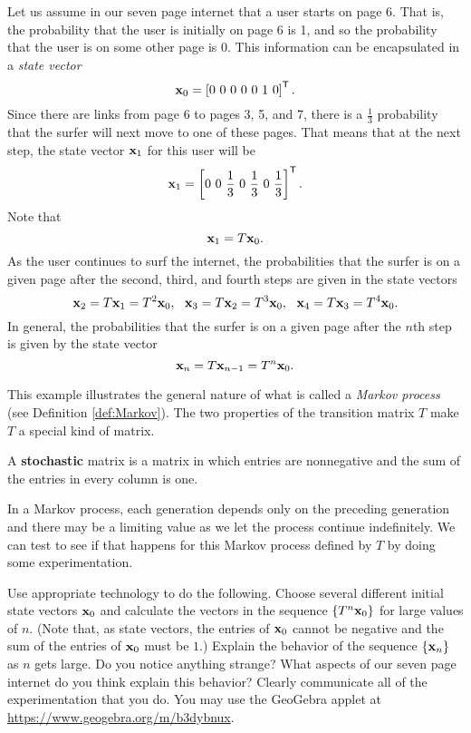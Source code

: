 Let us assume in our seven page internet that a user starts on page 6. That is, the probability that the user is initially on page 6 is 1, and so the probability that the user is on some other page is 0. This information can be encapsulated in a \emph{state vector}
\[\vx_0 = \left[ 0 \ 0 \ 0 \ 0 \ 0 \ 1 \ 0  \right]^{\tr}.\]
Since there are links from page 6 to pages 3, 5, and 7, there is a $\frac{1}{3}$ probability that the surfer will next move to one of these pages. That means that at the next step, the state vector $\mathbf{x}_1$ for this user will be
\[\vx_1 = \left[ 0 \ 0 \ \frac{1}{3} \ 0 \ \frac{1}{3} \ 0 \ \frac{1}{3} \right]^{\tr}.\]
Note that
\[\mathbf{x}_1 = T\mathbf{x}_0.\]
As the user continues to surf the internet, the probabilities that the surfer is on a given page after the second, third, and fourth steps are given in the state vectors
\[\mathbf{x}_2 = T\mathbf{x}_1 = T^2 \mathbf{x}_0, \ \ \mathbf{x}_3 = T\mathbf{x}_2 = T^3 \mathbf{x}_0, \ \ \mathbf{x}_4 = T\mathbf{x}_3 = T^4 \mathbf{x}_0.\]
In general, the probabilities that the surfer is on a given page after the $n$th step is given by the state vector
\[\mathbf{x}_n = T \mathbf{x}_{n-1} = T^n \mathbf{x}_0.\]

This example illustrates the general nature of what is called a \emph{Markov process} (see Definition \ref{def:Markov}).  The two properties of the transition matrix $T$ make $T$ a special kind of matrix.

\begin{definition}  A \textbf{stochastic} matrix is a matrix in which entries are nonnegative and the sum of the entries in every column is one.
\end{definition}

In a Markov process, each generation depends only on the preceding generation and there may be a limiting value as we let the process continue indefinitely. We can test to see if that happens for this Markov process defined by $T$ by doing some experimentation.


\begin{pactivity} \label{act:limit} Use appropriate technology to do the following. Choose several different initial state vectors $\mathbf{x}_0$ and calculate the vectors in the sequence $\{T^n\mathbf{x}_0\}$ for large values of $n$. (Note that, as state vectors, the entries of $\mathbf{x}_0$ cannot be negative and the sum of the entries of $\mathbf{x}_0$ must be $1$.) Explain the behavior of the sequence $\{\mathbf{x}_n\}$ as $n$ gets large. Do you notice anything strange? What aspects of our seven page internet do you think explain this behavior? Clearly communicate all of the experimentation that you do. You may use the GeoGebra applet at \url{https://www.geogebra.org/m/b3dybnux}.  


\end{pactivity}




